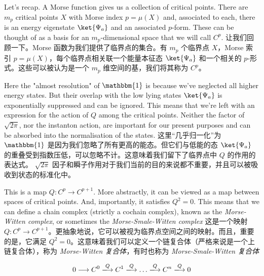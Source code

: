 \documentclass{article}
\begin{document}
\begin{paracol}{2}
Let’s recap. A Morse function gives us a collection of critical points. There are $m_p$ critical points $X$ with Morse index $p = \mu(X)$ and, associated to each, there is an energy eigenstate $\ket{\Psi_a}$ and an associated $p$-form. These can be thought of as a basis for an $m_p$-dimensional space that we will call $C^p$.
\switchcolumn
让我们回顾一下。Morse 函数为我们提供了临界点的集合。有 $m_p$ 个临界点 $X$，Morse 索引 $p = \mu(X)$，每个临界点相关联一个能量本征态 $\ket{\Psi_a}$ 和一个相关的 $p$-形式。这些可以被认为是一个 $m_p$ 维空间的基，我们将其称为 $C^p$。
\switchcolumn*

Here the "almost resolution" of $\mathbbm{1}$ is because we've neglected all higher energy states. But their overlap with the low lying states $\ket{\Psi_a}$ is exponentially suppressed and can be ignored. This means that we're left with an expression for the action of $Q$ among the critical points. Neither the factor of $\sqrt{2 \pi}$, nor the instanton action, are important for our present purposes and can be absorbed into the normalisation of the states.
\switchcolumn
这里“几乎归一化”为 $\mathbbm{1}$ 是因为我们忽略了所有更高的能态。但它们与低能的态 $\ket{\Psi_a}$ 的重叠受到指数压低，可以忽略不计。这意味着我们留下了临界点中 $Q$ 的作用的表达式。 $\sqrt{2 \pi}$ 因子和瞬子作用对于我们当前的目的来说都不重要，并且可以被吸收到状态的标准化中。
\switchcolumn*

This is a map $Q: C^p \to C^{p + 1}$. More abstractly, it can be viewed as a map between spaces of critical points. And, importantly, it satisfies $Q^2 = 0$. This means that we can define a chain complex (strictly a cochain complex), known as the \textit{Morse-Witten complex}, or sometimes the \textit{Morse-Smale-Witten complex}
\switchcolumn
这是一个映射 $Q: C^p \to C^{p + 1}$。更抽象地说，它可以被视为临界点空间之间的映射。而且，重要的是，它满足 $Q^2 = 0$。这意味着我们可以定义一个链复合体（严格来说是一个上链复合体），称为 \textit{Morse-Witten 复合体}，有时也称为 \textit{Morse-Smale-Witten 复合体}
\end{paracol}

\[ 0 \longrightarrow C^0 \xlongrightarrow{Q} C^1 \xlongrightarrow{Q} \dots \xlongrightarrow{Q} C^n \xlongrightarrow{Q} 0 \]
\end{document}

